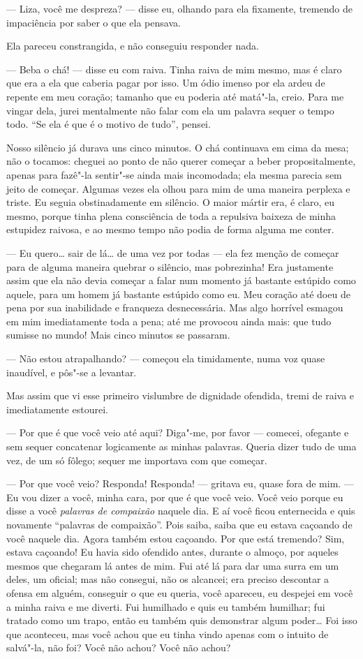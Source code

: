 --- Liza, você me despreza? --- disse eu, olhando para ela fixamente,
tremendo de impaciência por saber o que ela pensava.

Ela pareceu constrangida, e não conseguiu responder nada.

--- Beba o chá! --- disse eu com raiva. Tinha raiva de mim mesmo, mas é
claro que era a ela que caberia pagar por isso. Um ódio imenso por ela
ardeu de repente em meu coração; tamanho que eu poderia até matá"-la,
creio. Para me vingar dela, jurei mentalmente não falar com ela um
palavra sequer o tempo todo. “Se ela é que é o motivo de tudo”, pensei.

Nosso silêncio já durava uns cinco minutos. O chá continuava em cima da
mesa; não o tocamos: cheguei ao ponto de não querer começar a beber
propositalmente, apenas para fazê"-la sentir"-se ainda mais incomodada; ela
mesma parecia sem jeito de começar. Algumas vezes ela olhou para mim de
uma maneira perplexa e triste. Eu seguia obstinadamente em silêncio. O
maior mártir era, é claro, eu mesmo, porque tinha plena consciência de
toda a repulsiva baixeza de minha estupidez raivosa, e ao mesmo tempo
não podia de forma alguma me conter.

--- Eu quero\ldots{} sair de lá\ldots{} de uma vez por todas --- ela fez menção de
começar para de alguma maneira quebrar o silêncio, mas pobrezinha! Era
justamente assim que ela não devia começar a falar num momento já
bastante estúpido como aquele, para um homem já bastante estúpido como
eu. Meu coração até doeu de pena por sua inabilidade e franqueza
desnecessária. Mas algo horrível esmagou em mim imediatamente toda a
pena; até me provocou ainda mais: que tudo sumisse no mundo! Mais cinco
minutos se passaram.

--- Não estou atrapalhando? --- começou ela timidamente, numa voz quase
inaudível, e pôs"-se a levantar.

Mas assim que vi esse primeiro vislumbre de dignidade ofendida, tremi de
raiva e imediatamente estourei.

--- Por que é que você veio até aqui? Diga"-me, por favor --- comecei,
ofegante e sem sequer concatenar logicamente as minhas palavras. Queria
dizer tudo de uma vez, de um só fôlego; sequer me importava com que
começar.

--- Por que você veio? Responda! Responda! --- gritava eu, quase fora de mim.
--- Eu vou dizer a você, minha cara, por que é que você veio. Você veio porque
eu disse a você \textit{palavras de compaixão} naquele dia. E aí você ficou
enternecida e quis novamente “palavras de compaixão”. Pois saiba, saiba que eu
estava caçoando de você naquele dia. Agora também estou caçoando. Por que está
tremendo? Sim, estava caçoando! Eu havia sido ofendido antes, durante o almoço,
por aqueles mesmos que chegaram lá antes de mim. Fui até lá para dar uma surra em um
deles, um oficial; mas não consegui, não os alcancei; era preciso descontar a
ofensa em alguém, conseguir o que eu queria, você apareceu, eu despejei em você
a minha raiva e me diverti. Fui humilhado e quis eu também humilhar; fui
tratado como um trapo, então eu também quis demonstrar algum poder\ldots{} Foi
isso que aconteceu, mas você achou que eu tinha vindo apenas com o intuito de
salvá"-la, não foi? Você não achou? Você não achou?

